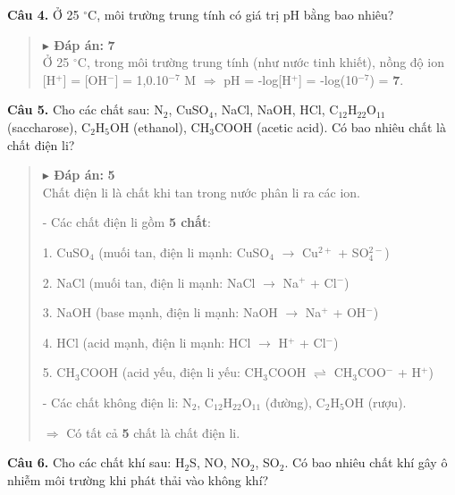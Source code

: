 \documentclass[11pt,a4paper]{article}
\begin{document}
\textbf{Câu 4.} Ở 25 $^\circ\text{C}$, môi trường trung tính có giá trị pH bằng bao nhiêu?


\begin{quote}\small
{\color{myBlue}\textbf{$\blacktriangleright$ Đáp án:}} \textbf{\color{red} 7}\\
Ở 25 $^\circ\text{C}$, trong môi trường trung tính (như nước tinh khiết), nồng độ ion [H$^{+}$] = [OH$^{-}$] = 1,0.10$^{-7}$ M $\Rightarrow$ pH = -log[H$^{+}$] = -log(10$^{-7}$) = \textbf{7}.
\end{quote}
\vspace{2pt}

\textbf{Câu 5.} Cho các chất sau: N$_{2}$, CuSO$_{4}$, NaCl, NaOH, HCl, C$_{12}$H$_{22}$O$_{11}$ (saccharose), C$_{2}$H$_{5}$OH (ethanol), CH$_{3}$COOH (acetic acid). Có bao nhiêu chất là chất điện li?


\begin{quote}\small
{\color{myBlue}\textbf{$\blacktriangleright$ Đáp án:}} \textbf{\color{red} 5}\\
Chất điện li là chất khi tan trong nước phân li ra các ion.

- Các chất điện li gồm \textbf{5 chất}:

  1. CuSO$_{4}$ (muối tan, điện li mạnh: CuSO$_{4}$ $\longrightarrow$ Cu$^{2+}$ + SO$_{4}^{2-}$)

  2. NaCl (muối tan, điện li mạnh: NaCl $\longrightarrow$ Na$^{+}$ + Cl$^{-}$)

  3. NaOH (base mạnh, điện li mạnh: NaOH $\longrightarrow$ Na$^{+}$ + OH$^{-}$)

  4. HCl (acid mạnh, điện li mạnh: HCl $\longrightarrow$ H$^{+}$ + Cl$^{-}$)

  5. CH$_{3}$COOH (acid yếu, điện li yếu: CH$_{3}$COOH $\rightleftharpoons$ CH$_{3}$COO$^{-}$ + H$^{+}$)

- Các chất không điện li: N$_{2}$, C$_{12}$H$_{22}$O$_{11}$ (đường), C$_{2}$H$_{5}$OH (rượu).

$\Rightarrow$ Có tất cả \textbf{5} chất là chất điện li.
\end{quote}
\vspace{2pt}

\textbf{Câu 6.} Cho các chất khí sau: H$_{2}$S, NO, NO$_{2}$, SO$_{2}$. Có bao nhiêu chất khí gây ô nhiễm môi trường khi phát thải vào không khí?
\end{document}
